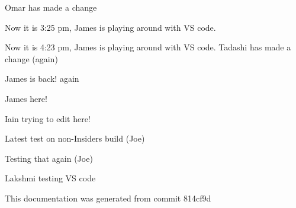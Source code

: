\label{index_md_repo_README}%
%
Omar has made a change

Now it is 3\+:25 pm, James is playing around with VS code.

Now it is 4\+:23 pm, James is playing around with VS code. Tadashi has made a change (again)

James is back! again

James here!

Iain trying to edit here!

Latest test on non-\/\+Insiders build (Joe)

Testing that again (Joe)

Lakshmi testing VS code

This documentation was generated from commit 814cf9d 